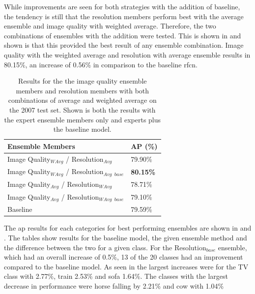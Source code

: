 While improvements are seen for both strategies with the addition of baseline, the tendency is still that the resolution members perform best with the average ensemble and image quality with weighted average. Therefore, the two combinations of ensembles with the addition were tested. This is shown in  and shown is that this provided the best result of any ensemble combination. Image quality with the weighted average and resolution with average ensemble results in 80.15\%, an increase of 0.56\% in comparison to the baseline \gls{rfcn}.

\begin{table}[h]
\centering
\caption{Results for the the image quality ensemble members and resolution members with both combinations of average and weighted average on the 2007 test set.  Shown is both the results with the expert ensemble members only and experts plus the baseline model.}
\label{tab:ensemble_comb_base}
\begin{tabular}{|l|l|}
\hline
\textbf{Ensemble Members}                  & \textbf{AP (\%)} \\ \hline
Image Quality$_{WAvg}$ / Resolution$_{Avg}$  & 79.90\% \\ \hline
Image Quality$_{WAvg}$ / Resolution$_{Avg}$ $_{base}$ & \textbf{80.15\%} \\ \hline
Image Quality$_{Avg}$ / Resolution$_{WAvg}$ & 78.71\% \\ \hline
Image Quality$_{Avg}$ / Resolution$_{WAvg}$ $_{base}$ & 79.10\% \\ \hline
Baseline                          & 79.59\% \\ \hline
\end{tabular}
\end{table}


The \gls{ap} results for each categories for best performing ensembles are shown in  and . The tables show results for the baseline model, the given ensemble method and the difference between the two for a given class. For the Resolution$_{base}$ ensemble, which had an overall increase of 0.5\%, 13 of the 20 classes had an improvement compared to the baseline model. As seen in  the largest increases were for the TV class with 2.77\%, train 2.53\% and sofa 1.64\%. The classes with the largest decrease in performance were horse falling by 2.21\% and cow with 1.04\%


